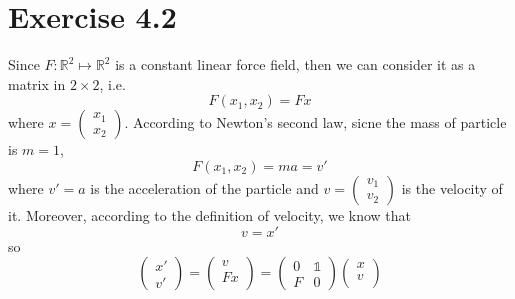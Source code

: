 \documentclass[a4paper,12pt,titlepage]{article}
\begin{document}
\section*{Exercise 4.2}
Since $F:\mathbb{R}^2\mapsto \mathbb{R}^2$ is a constant linear force field, then we can consider it as a matrix in $2\times 2$, i.e.
$$F(x_1,x_2)=Fx$$
where $x=\begin{pmatrix}
x_1\\
x_2
\end{pmatrix}
$. According to Newton's second law, sicne the mass of particle is $m=1$,
$$F(x_1,x_2)=ma=v'$$
where $v'=a$ is the acceleration of the particle and $v=\begin{pmatrix}
v_1\\
v_2
\end{pmatrix}$ is the velocity of it. Moreover, according to the definition of velocity, we know  that
$$v=x'$$ 
so
$$\begin{pmatrix}
x'\\
v'
\end{pmatrix}=\begin{pmatrix}
v\\
Fx\\
\end{pmatrix}=\begin{pmatrix}
0&\mathds{1}\\
F&0
\end{pmatrix}\begin{pmatrix}
x\\
v\\
\end{pmatrix}$$
\end{document}
